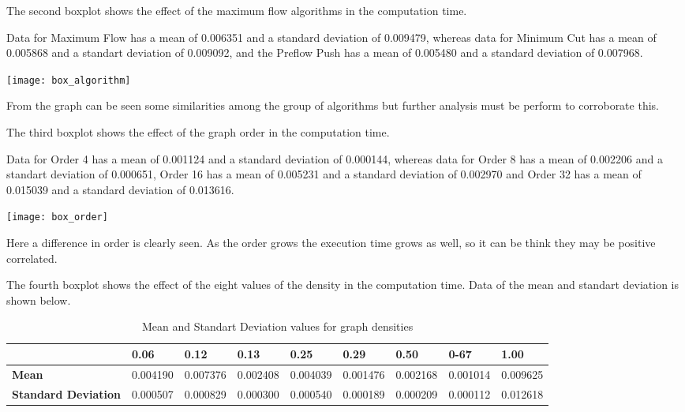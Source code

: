 \documentclass[10pt,a4paper,openany]{article}
\begin{document}
	The second boxplot shows the effect of the maximum flow algorithms in the computation time.
	
	Data for Maximum Flow has a mean of 0.006351 and a standard deviation of 0.009479, whereas data for Minimum Cut has a mean of 0.005868 and a standart deviation of 0.009092, and the Preflow Push has a mean of 0.005480 and a standard deviation of 0.007968.
	
	\begin{center}
		\texttt{[image: box\_algorithm]}
	\end{center}

	From the graph can be seen some similarities among the group of algorithms but further analysis must be perform to corroborate this.

	The third boxplot shows the effect of the graph order in the computation time.
	
	Data for Order 4 has a mean of 0.001124 and a standard deviation of 0.000144, whereas data for Order 8 has a mean of 0.002206 and a standart deviation of 0.000651, Order 16  has a mean of 0.005231 and a standard deviation of  0.002970 and Order 32 has a mean of 0.015039 and a standard deviation of 0.013616.   

	\begin{center}
	\texttt{[image: box\_order]}
	\end{center}

	Here a difference in order is clearly seen. As the order grows the execution time grows as well, so it can be think they may be positive correlated.

	The fourth boxplot shows the effect of the eight values of the density in the computation time. Data of the mean and standart deviation is shown below.
	
	\begin{table}[H]
		\caption{Mean and Standart Deviation values for graph densities}
		\label{my-label}
		\begin{tabular}{|l|l|l|l|l|l|l|l|l|}
			\hline
			& \textbf{0.06}                 & \textbf{0.12}                 & \textbf{0.13}                 & \textbf{0.25}                 & \textbf{0.29}                 & \textbf{0.50}                 & \textbf{0-67}                 & \textbf{1.00}                 \\ \hline
			\textbf{Mean}               & \multicolumn{1}{r|}{0.004190} & \multicolumn{1}{r|}{0.007376} & \multicolumn{1}{r|}{0.002408} & \multicolumn{1}{r|}{0.004039} & \multicolumn{1}{r|}{0.001476} & \multicolumn{1}{r|}{0.002168} & \multicolumn{1}{r|}{0.001014} & \multicolumn{1}{r|}{0.009625} \\ \hline
			\textbf{Standard Deviation} & 0.000507                      & 0.000829                      & 0.000300                      & 0.000540                      & 0.000189                      & 0.000209                      & 0.000112                      & 0.012618                      \\ \hline
		\end{tabular}
	\end{table}
\end{document}
